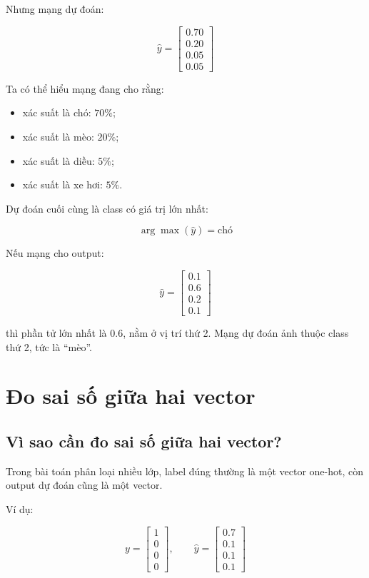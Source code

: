 Nhưng mạng dự đoán:

\[
    \hat{y} =
    \begin{bmatrix}
    0.70\\
    0.20\\
    0.05\\
    0.05
    \end{bmatrix}
\]

Ta có thể hiểu mạng đang cho rằng:

\begin{itemize}
    \item xác suất là chó: $70\%$;
    \item xác suất là mèo: $20\%$;
    \item xác suất là diều: $5\%$;
    \item xác suất là xe hơi: $5\%$.
\end{itemize}

Dự đoán cuối cùng là class có giá trị lớn nhất:

\[
    \arg\max(\hat{y}) = \text{chó}
\]

\begin{vidu}
Nếu mạng cho output:

\[
    \hat{y} =
    \begin{bmatrix}
    0.1\\
    0.6\\
    0.2\\
    0.1
    \end{bmatrix}
\]

thì phần tử lớn nhất là $0.6$, nằm ở vị trí thứ 2. Mạng dự đoán ảnh thuộc class thứ 2, tức là ``mèo''.
\end{vidu}

\section{Đo sai số giữa hai vector}

\subsection{Vì sao cần đo sai số giữa hai vector?}

Trong bài toán phân loại nhiều lớp, label đúng thường là một vector one-hot, còn output dự đoán cũng là một vector.

Ví dụ:

\[
    y =
    \begin{bmatrix}
    1\\0\\0\\0
    \end{bmatrix},
    \qquad
    \hat{y} =
    \begin{bmatrix}
    0.7\\
    0.1\\
    0.1\\
    0.1
    \end{bmatrix}
\]

